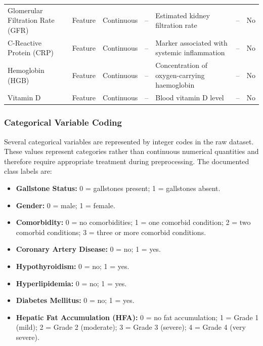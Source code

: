 \begin{longtable}{
    p{4.0cm}
    p{1.3cm}
    p{1.6cm}
    p{1.4cm}
    p{5.0cm}
    p{1.0cm}
    p{1.2cm}
}
Glomerular Filtration Rate (GFR)
& Feature & Continuous & --
& Estimated kidney filtration rate
& -- & No \\

C-Reactive Protein (CRP)
& Feature & Continuous & --
& Marker associated with systemic inflammation
& -- & No \\

Hemoglobin (HGB)
& Feature & Continuous & --
& Concentration of oxygen-carrying haemoglobin
& -- & No \\

Vitamin D
& Feature & Continuous & --
& Blood vitamin D level
& -- & No \\

\end{longtable}

\subsubsection{Categorical Variable Coding}
\label{subsubsec:categorical-coding}

Several categorical variables are represented by integer codes in the raw dataset. These values represent categories rather than continuous numerical quantities and therefore require appropriate treatment during preprocessing. The documented class labels are:

\begin{itemize}
    \item \textbf{Gallstone Status:}
    0 = gallstones present;
    1 = gallstones absent.

    \item \textbf{Gender:}
    0 = male;
    1 = female.

    \item \textbf{Comorbidity:}
    0 = no comorbidities;
    1 = one comorbid condition;
    2 = two comorbid conditions;
    3 = three or more comorbid conditions.

    \item \textbf{Coronary Artery Disease:}
    0 = no;
    1 = yes.

    \item \textbf{Hypothyroidism:}
    0 = no;
    1 = yes.

    \item \textbf{Hyperlipidemia:}
    0 = no;
    1 = yes.

    \item \textbf{Diabetes Mellitus:}
    0 = no;
    1 = yes.

    \item \textbf{Hepatic Fat Accumulation (HFA):}
    0 = no fat accumulation;
    1 = Grade 1 (mild);
    2 = Grade 2 (moderate);
    3 = Grade 3 (severe);
    4 = Grade 4 (very severe).
\end{itemize}

